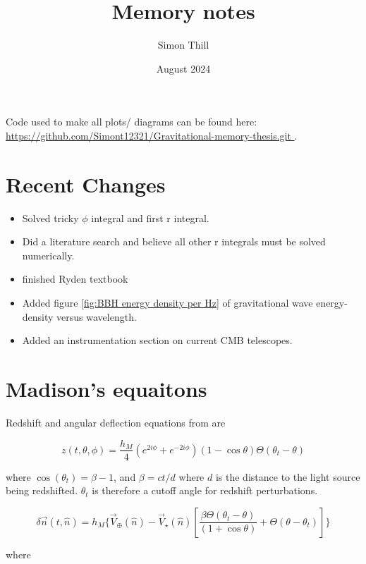 \documentclass{article}
\title{Memory notes}
\author{Simon Thill}
\date{August 2024}
\begin{document}
\maketitle

Code used to make all plots/ diagrams can be found here: \url{https://github.com/Simont12321/Gravitational-memory-thesis.git }.

\section{Recent Changes}

\begin{itemize}
    \item Solved tricky $\phi$ integral and first r integral. 
    \item Did a literature search and believe all other r integrals must be solved numerically. 
    \item finished Ryden textbook
    \item Added figure \ref{fig:BBH energy density per Hz} of gravitational wave energy-density versus wavelength. 
    \item Added an instrumentation section on current CMB telescopes. 
\end{itemize}

\section{Madison's equaitons}

Redshift and angular deflection equations from \cite{madison2021framework} are 

\begin{equation}
    z(t, \theta, \phi) = \frac{h_M}{4}(e^{2i\phi} + e^{-2i\phi})(1-\cos\theta)\Theta(\theta_t - \theta)
    \label{eq: z_madison}
\end{equation}

where $\cos(\theta_t) = \beta - 1$, and $\beta = ct/d$ where $d$ is the distance to the light source being redshifted. $\theta_t$ is therefore a cutoff angle for redshift perturbations. 


\begin{equation}
    \delta\vec{n}(t,\hat{n}) = h_M \{\vec{V}_\oplus(\hat{n}) - \vec{V}_\star(\hat{n})\left[\frac{\beta\Theta(\theta_t - \theta)}{(1+\cos\theta)} + \Theta(\theta - \theta_t)\right]\}
    \label{eq: del_n_madison}
\end{equation}

where 
\end{document}
